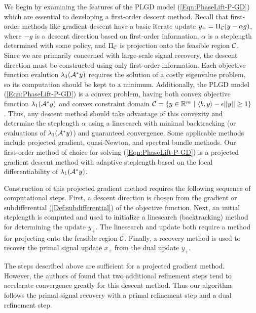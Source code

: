 We begin by examining the features of the PLGD model (\ref{Eqn:PhaseLift-P-GD}) which are essential to developing a first-order descent method.  Recall that first-order methods like gradient descent have a basic iterate update $y_+ = \Pi_{\mathcal C}(y - \alpha g)$, where $-g$ is a descent direction based on first-order information, $\alpha$ is a steplength determined with some policy, and $\Pi_{\mathcal C}$ is projection onto the feasible region ${\mathcal C}$.  Since we are primarily concerned with large-scale signal recovery, the descent direction must be constructed using only first-order information.  Each objective function evalution $\lambda_1({\mathcal A}^*y)$ requires the solution of a costly eigenvalue problem, so its computation should be kept to a minimum.  Additionally, the PLGD model (\ref{Eqn:PhaseLift-P-GD}) is a convex problem, having both convex objective function $\lambda_1({\mathcal A}^* y)$ and convex constraint domain ${\mathcal C} = \{ y \in \mathbb{R}^m \ | \ \langle b, y \rangle - \epsilon ||y|| \geq 1 \}$.   Thus, any descent method should take advantage of this convexity and determine the steplength $\alpha$ using a linesearch with minimal backtracking (or evaluations of $\lambda_1({\mathcal A}^*y)$) and guaranteed convergence.  Some applicable methods include projected gradient, quasi-Newton, and spectral bundle methods.  Our first-order method of choice for solving (\ref{Eqn:PhaseLift-P-GD}) is a projected gradient descent method with adaptive steplength based on the local differentiability of $\lambda_1({\mathcal A}^* y)$.




Construction of this projected gradient method requires the following sequence of computational steps.  First, a descent direction is chosen from the gradient or subdifferential (\ref{Def:subdifferential}) of the objective function.  Next, an initial steplength is computed and used to initialize a linesearch (backtracking) method for determining the update $y_+$.  The linesearch and update both require a method for projecting onto the feasible region ${\mathcal C}$.  Finally, a recovery method is used to recover the primal signal update $x_+$ from the dual update $y_+$.

The steps described above are sufficient for a projected gradient method.  However, the authors of \cite{DBLP:journals/siamsc/FriedlanderM16} found that two additional refinement steps tend to accelerate convergence greatly for this descent method.  Thus our algorithm follows the primal signal recovery with a primal refinement step and a dual refinement step.





